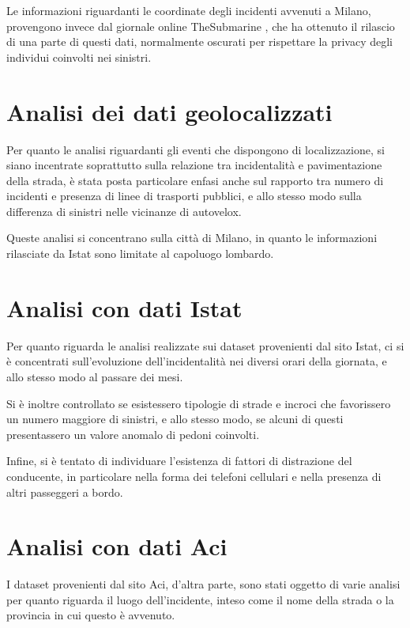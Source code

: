 \documentclass[a4paper]{article}
\begin{document}
Le informazioni riguardanti le coordinate degli incidenti avvenuti a Milano, provengono invece 
dal giornale online TheSubmarine \cite{SUBMARINE:1}, 
che ha ottenuto il rilascio di una parte di questi dati, 
normalmente oscurati per rispettare la privacy degli individui coinvolti nei sinistri.

\section{Analisi dei dati geolocalizzati}

Per quanto le analisi riguardanti gli eventi che dispongono di localizzazione, 
si siano incentrate soprattutto sulla relazione tra incidentalità e pavimentazione 
della strada, è stata posta particolare enfasi anche sul rapporto tra numero di 
incidenti e presenza di linee di trasporti pubblici, 
e allo stesso modo sulla differenza di sinistri nelle vicinanze di autovelox. 

Queste analisi si concentrano sulla città di Milano, in quanto le informazioni rilasciate da 
Istat sono limitate al capoluogo lombardo.

\section{Analisi con dati Istat}

Per quanto riguarda le analisi realizzate sui dataset provenienti dal sito Istat, 
ci si è concentrati sull'evoluzione dell'incidentalità nei diversi orari della giornata, 
e allo stesso modo al passare dei mesi. 

Si è inoltre controllato se esistessero tipologie di strade e incroci che favorissero 
un numero maggiore di sinistri, e allo stesso modo, se alcuni di questi presentassero 
un valore anomalo di pedoni coinvolti.

Infine, si è tentato di individuare l'esistenza di fattori di distrazione del 
conducente, in particolare nella forma dei telefoni cellulari e nella presenza 
di altri passeggeri a bordo. 

\section{Analisi con dati Aci}

I dataset provenienti dal sito Aci, d'altra parte, sono stati oggetto di varie analisi per 
quanto riguarda il luogo dell'incidente, inteso come il nome della strada o la provincia 
in cui questo è avvenuto. 
\end{document}
